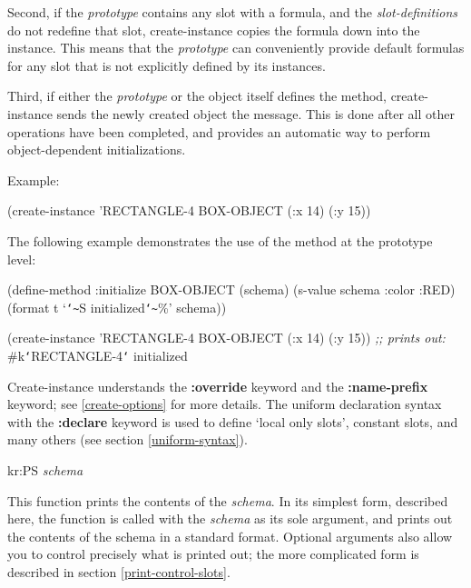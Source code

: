 Second, if the {\it prototype} contains any slot with a formula, and the
{\it slot-definitions} do not redefine that slot, create-instance copies
the formula down into the instance.  This means that the {\it prototype} can
conveniently provide default formulas for any slot
that is not explicitly defined by its instances.

Third, if either the {\it prototype} or the object itself defines the
 method, create-instance sends
the newly created object the  message.  This is done after
all other operations have been completed, and provides an automatic way to
perform object-dependent initializations.

Example:
\begin{programexample}
(create-instance 'RECTANGLE-4 BOX-OBJECT (:x 14) (:y 15))
\end{programexample}

The following example demonstrates the use of the
method at the prototype level:
\begin{programexample}
(define-method :initialize BOX-OBJECT (schema)
   (s-value schema :color :RED)
   (format t `{\tt\char`\~}S initialized{\tt\char`\~}\%' schema))

(create-instance 'RECTANGLE-4 BOX-OBJECT (:x 14) (:y 15))
{\it ;; prints out:}
\#k{\tt\char`\<}RECTANGLE-4{\tt\char`\>} initialized
\end{programexample}

Create-instance understands the  {\bf :override} keyword and the
{\bf :name-prefix} keyword; see \ref{create-options} for more details.
The uniform declaration syntax with the {\bf :declare} keyword is used
to define `local only slots', constant slots, and many others (see section
\ref{uniform-syntax}).


\value{f-top}
\begin{example}
kr:PS {\it schema}\value{function}
\end{example}

This function prints the contents of the {\it schema}.  In its simplest form,
described here, the function is called with the {\it schema} as its sole
argument, and prints out the contents of the schema in a standard format.
Optional arguments also allow you to control precisely what is printed out; the
more complicated form is described in section \ref{print-control-slots}.


